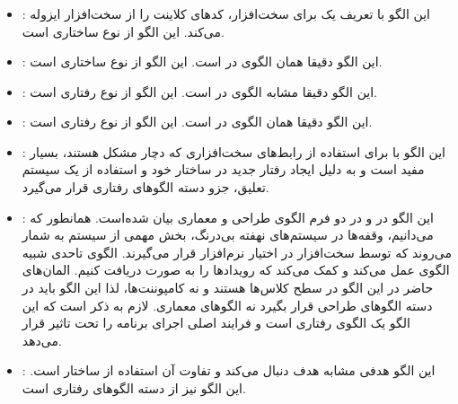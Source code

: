 \subsubsection{}
\begin{itemize}
\item {}: %
این الگو با تعریف یک  \cite{ref3}
برای سخت‌افزار، کدهای کلاینت را از سخت‌افزار ایزوله می‌کند.
این الگو از نوع ساختاری است.
\item {}: %
این الگو دقیقا همان الگوی  در \cite{ref3}
است. این الگو از نوع ساختاری است.
\item {}: %
این الگو دقیقا مشابه الگوی  در \cite{ref3}
است. این الگو از نوع رفتاری است.
\item {}: %
این الگو دقیقا همان الگوی  در \cite{ref3}
است. این الگو از نوع رفتاری است.
\item {}: %
این الگو با برای استفاده از رابط‌های سخت‌افزاری که دچار مشکل
 هستند، بسیار مفید است و به دلیل ایجاد
رفتار جدید در ساختار خود و استفاده از یک سیستم تعلیق، جزو دسته
الگوهای رفتاری \cite{ref3} قرار می‌گیرد.
\item {}: %
این الگو در \cite{ref1} و \cite{ref4} در دو فرم
الگوی طراحی و معماری بیان شده‌است. همانطور که می‌دانیم، وقفه‌ها در
سیستم‌های نهفته بی‌درنگ، بخش مهمی از سیستم به شمار می‌روند
که توسط سخت‌افزار در اختیار نرم‌افزار قرار می‌گیرند. الگوی 
تاحدی شبیه الگوی  عمل می‌کند و کمک می‌کند که رویدادها
را به صورت  دریافت کنیم. المان‌های
حاضر در این الگو در سطح کلاس‌ها هستند و نه کامپوننت‌ها، لذا این الگو باید در
دسته الگوهای طراحی قرار بگیرد نه الگوهای معماری. لازم به ذکر است
که این الگو یک الگوی رفتاری است و فرایند اصلی اجرای برنامه را تحت تاثیر
قرار می‌دهد.
\item {}: %
این الگو هدفی مشابه هدف 
دنبال می‌کند و تفاوت آن استفاده از ساختار 
است. این الگو نیز از دسته الگوهای رفتاری است.
\end{itemize}

